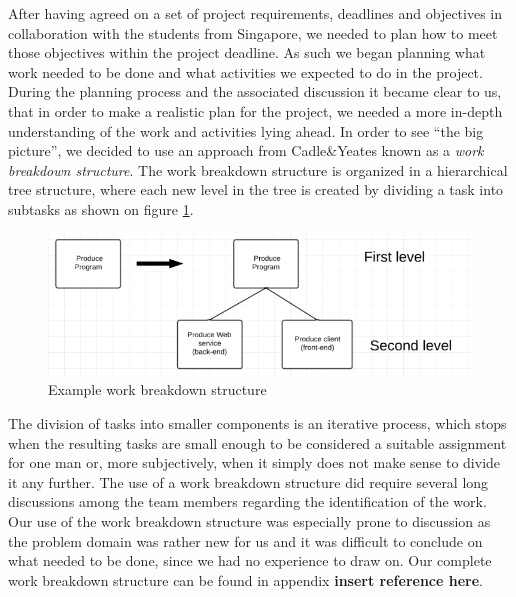 After having agreed on a set of project requirements, deadlines and objectives in collaboration with the students from Singapore, we needed to plan how to meet those objectives within the project deadline. As such we began planning what work needed to be done and what activities we expected to do in the project.
During the planning process and the associated discussion it became clear to us, that in order to make a realistic plan for the project, we needed a more in-depth understanding of the work and activities lying ahead. In order to see “the big picture”, we decided to use an approach from Cadle\&Yeates \cite{caye} known as a \emph{work breakdown structure}. The work breakdown structure is organized in a hierarchical tree structure, where each new level in the tree is created by dividing a task into subtasks as shown on figure \ref{fig:breakdown}.

\begin{figure}[hbtp]
	\label{fig:breakdown}
	\includegraphics[scale=0.5]{./Empiri/Planning/img/wbslevels.png}
	\caption{Example work breakdown structure} 
\end{figure}
The division of tasks into smaller components is an iterative process, which stops when the resulting tasks are small enough to be considered a suitable assignment for one man or, more subjectively, when it simply does not make sense to divide it any further.
The use of a work breakdown structure did require several long discussions among the team members regarding the identification of the work. Our use of the work breakdown structure was especially prone to discussion as the problem domain was rather new for us and it was difficult to conclude on what needed to be done, since we had no experience to draw on.
Our complete work breakdown structure can be found in appendix \textbf{insert reference here}.

